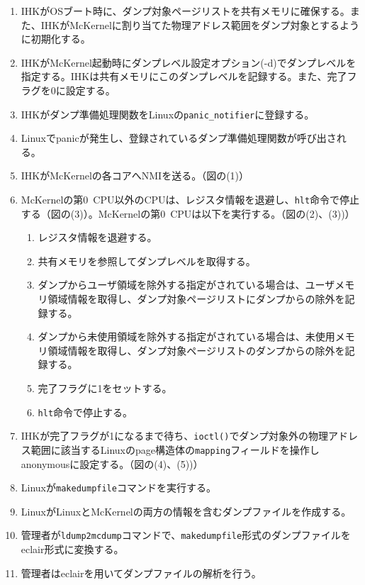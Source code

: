 \documentclass[twoside,11pt,fleqn]{book}
\begin{document}
\begin{enumerate}
\item IHKがOSブート時に、ダンプ対象ページリストを共有メモリに確保する。また、IHKがMcKernelに割り当てた物理アドレス範囲をダンプ対象とするように初期化する。
\item IHKがMcKernel起動時にダンプレベル設定オプション(-d)でダンプレベルを指定する。IHKは共有メモリにこのダンプレベルを記録する。また、完了フラグを0に設定する。
\item IHKがダンプ準備処理関数をLinuxの\texttt{panic\_notifier}に登録する。
\item Linuxでpanicが発生し、登録されているダンプ準備処理関数が呼び出される。
\item IHKがMcKernelの各コアへNMIを送る。（図の(1)）
\item McKernelの第0~CPU以外のCPUは、レジスタ情報を退避し、\texttt{hlt}命令で停止する（図の(3)）。McKernelの第0~CPUは以下を実行する。（図の(2)、(3))）
\begin{enumerate}
\item レジスタ情報を退避する。
\item 共有メモリを参照してダンプレベルを取得する。
\item ダンプからユーザ領域を除外する指定がされている場合は、ユーザメモリ領域情報を取得し、ダンプ対象ページリストにダンプからの除外を記録する。
\item ダンプから未使用領域を除外する指定がされている場合は、未使用メモリ領域情報を取得し、ダンプ対象ページリストのダンプからの除外を記録する。
\item 完了フラグに1をセットする。
\item \texttt{hlt}命令で停止する。
\end{enumerate}
\item IHKが完了フラグが1になるまで待ち、\texttt{ioctl()}でダンプ対象外の物理アドレス範囲に該当するLinuxのpage構造体の\texttt{mapping}フィールドを操作しanonymousに設定する。（図の(4)、(5))）
\item Linuxが\texttt{makedumpfile}コマンドを実行する。
\item LinuxがLinuxとMcKernelの両方の情報を含むダンプファイルを作成する。
\item 管理者が\texttt{ldump2mcdump}コマンドで、\texttt{makedumpfile}形式のダンプファイルをeclair形式に変換する。
\item 管理者はeclairを用いてダンプファイルの解析を行う。
\end{enumerate}
\end{document}
